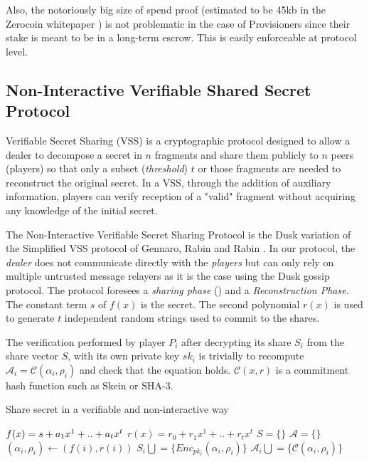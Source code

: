 Also, the notoriously big size of spend proof (estimated to be 45kb in the Zerocoin whitepaper \cite{zerocoin}) is not problematic in the case of Provisioners since their stake is meant to be in a long-term escrow. This is easily enforceable at protocol level.

\subsection{Non-Interactive Verifiable Shared Secret Protocol}

Verifiable Secret Sharing (VSS) is a cryptographic protocol designed to allow a dealer to decompose a secret in $n$ fragments and share them publicly to $n$ peers (players) so that only a subset (\textit{threshold}) $t$ or those fragments are needed to reconstruct the original secret. In a VSS, through the addition of auxiliary information, players can verify reception of a "valid" fragment without acquiring any knowledge of the initial secret.

The Non-Interactive Verifiable Secret Sharing Protocol is the \textrm{Dusk} variation of the Simplified VSS protocol of Gennaro, Rabin and Rabin \cite{grr}. In our protocol, the \textit{dealer} does not communicate directly with the \textit{players} but can only rely on multiple untrusted message relayers as it is the case using the \textrm{Dusk} gossip protocol. The protocol foresees a \textit{sharing phase} () and a \textit{Reconstruction Phase}. The constant term $s$ of $f(x)$ is the secret. The second polynomial $r(x)$ is used to generate $t$ independent random strings used to commit to the shares.

The verification performed by player $P_i$ after decrypting its share $S_i$ from the share vector $S$, with its own private key $sk_i$ is trivially to recompute $\mathcal{A}_i = \mathcal{C}(\alpha_i, \rho_i)$ and check that the equation holds. $\mathcal{C}(x, r)$ is a commitment hash function such as $\textrm{Skein}$ or $\textrm{SHA-3}$.

    \begin{algorithm}
        \caption{Share secret in a verifiable and non-interactive way}
        \begin{algorithmic}[1]
             
                \State $f(x) = s \space + a_1x^1 + .. + a_tx^t$ 
                \State $r(x) = r_0 + r_1x^1 + .. + r_tx^t$ 
                \State $S = \{\}$
                \State $\mathcal{A} = \{\}$
                	\State $(\alpha_i, \rho_i) \leftarrow (f(i), r(i))$
                	\State $S_i \bigcup = \{Enc_{pk_i}(\alpha_i, \rho_i)\}$
                	\State $\mathcal{A}_i \bigcup = \{\mathcal{C}(\alpha_i, \rho_i)\}$
                \EndFor
            \EndProcedure
        \end{algorithmic}
    \end{algorithm}

